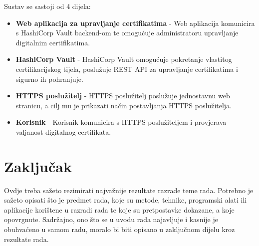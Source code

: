 \documentclass[]{foi}
\begin{document}
Sustav se sastoji od 4 dijela:
\begin{itemize}
  \item \textbf{Web aplikacija za upravljanje certifikatima} - Web aplikacija komunicira s HashiCorp Vault backend-om te omogućuje administratoru upravljanje digitalnim certifikatima.
  \item \textbf{HashiCorp Vault} - HashiCorp Vault omogućuje pokretanje vlastitog certifikacijskog tijela, 
  poslužuje REST API za upravljanje certifikatima i sigurno ih pohranjuje.
  \item \textbf{HTTPS poslužitelj} - HTTPS poslužitelj poslužuje jednostavnu web stranicu, a cilj mu je prikazati način postavljanja 
  HTTPS poslužitelja.
  \item \textbf{Korisnik} - Korisnik komunicira s HTTPS poslužiteljem i provjerava valjanost digitalnog certifikata.
\end{itemize}

\chapter{Zaključak}

Ovdje treba sažeto rezimirati najvažnije rezultate razrade teme rada. Potrebno je sažeto opisati što je predmet rada, koje su metode, tehnike, programski alati ili aplikacije korištene u razradi rada te koje su pretpostavke dokazane, a koje opovrgnute. Sadržajno, ono što se u uvodu rada najavljuje i kasnije je obuhvaćeno u samom radu, moralo bi biti opisano u zaključnom dijelu kroz rezultate rada.

\makebackmatter



\end{document}
